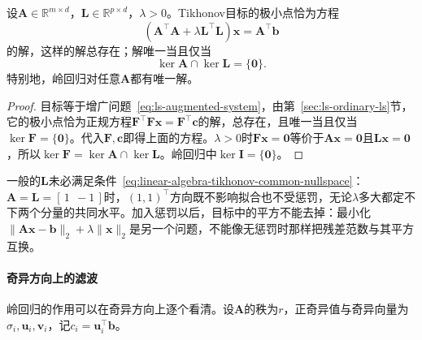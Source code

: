 \begin{theorem}[Tikhonov解的存在与唯一]
\label{thm:ls-tikhonov-existence-uniqueness}
设$\bm A\in\mathbb R^{m\times d}$，$\bm L\in\mathbb R^{p\times d}$，$\lambda>0$。Tikhonov目标的极小点恰为方程
\[
 (\bm A^\top\bm A+\lambda\bm L^\top\bm L)\bm x=\bm A^\top\bm b
\]
的解，这样的解总存在；解唯一当且仅当
\begin{equation}
 \ker\bm A\cap\ker\bm L=\{\bm0\}.
 \label{eq:linear-algebra-tikhonov-common-nullspace}
\end{equation}
特别地，岭回归对任意$\bm A$都有唯一解。
\end{theorem}
\begin{proof}
目标等于增广问题~\eqref{eq:ls-augmented-system}，由第~\ref{sec:ls-ordinary-ls}节，它的极小点恰为正规方程$\bm F^\top\bm F\bm x=\bm F^\top\bm c$的解，总存在，且唯一当且仅当$\ker\bm F=\{\bm0\}$。代入$\bm F,\bm c$即得上面的方程。$\lambda>0$时$\bm F\bm x=\bm0$等价于$\bm A\bm x=\bm0$且$\bm L\bm x=\bm0$，所以$\ker\bm F=\ker\bm A\cap\ker\bm L$。岭回归中$\ker\bm I=\{\bm0\}$。
\end{proof}

一般的$\bm L$未必满足条件~\eqref{eq:linear-algebra-tikhonov-common-nullspace}：$\bm A=\bm L=[\,1\ \ -1\,]$时，$(1,1)^\top$方向既不影响拟合也不受惩罚，无论$\lambda$多大都定不下两个分量的共同水平。加入惩罚以后，目标中的平方不能去掉：最小化$\lVert\bm A\bm x-\bm b\rVert_2+\lambda\lVert\bm x\rVert_2$是另一个问题，不能像无惩罚时那样把残差范数与其平方互换。

\paragraph{奇异方向上的滤波}
岭回归的作用可以在奇异方向上逐个看清。设$\bm A$的秩为$r$，正奇异值与奇异向量为$\sigma_i,\bm u_i,\bm v_i$，记$c_i=\bm u_i^\top\bm b$。

